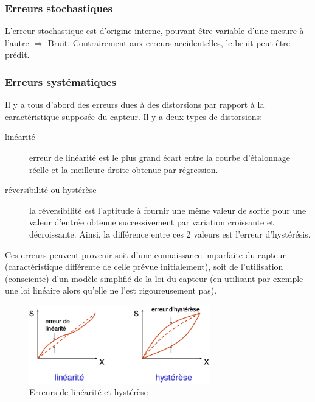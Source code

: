 \subsubsection{Erreurs stochastiques}
L'erreur stochastique est d'origine interne, pouvant être variable d'une mesure à l'autre \(\Rightarrow\) Bruit. Contrairement aux erreurs accidentelles, le bruit peut être prédit.
\subsubsection{Erreurs systématiques}
Il y a tous d'abord des erreurs dues à des distorsions par rapport à la caractéristique supposée du capteur. Il y a deux types de distorsions:
\begin{description}
	\item[linéarité] erreur de linéarité est le plus grand écart entre la courbe d'étalonnage réelle et la meilleure droite obtenue par régression.
	\item[réversibilité \textnormal{ou} hystérèse] la réversibilité est l'aptitude à fournir une même valeur de sortie pour une valeur d'entrée obtenue successivement par variation croissante et décroissante. Ainsi, la différence entre ces 2 valeurs est l'erreur d'hystérésis.
\end{description}
Ces erreurs peuvent provenir soit d'une connaissance imparfaite du capteur (caractéristique différente de celle prévue initialement), soit de l'utilisation (consciente) d'un modèle simplifié de la loi du capteur (en utilisant par exemple une loi linéaire alors qu'elle ne l'est rigoureusement pas).
\begin{figure}[H]
	\centering 
	\includegraphics[width=0.7\textwidth,height=10\baselineskip,keepaspectratio]{ch2/image6}
	\caption{Erreurs de linéarité et hystérèse}
\end{figure}

